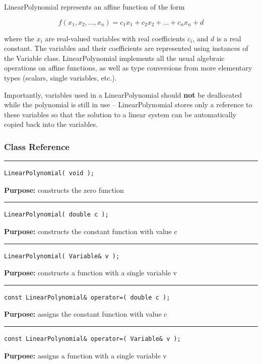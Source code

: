 \documentclass{article}
\begin{document}
 

 LinearPolynomial represents an affine function of the form 

 \[ f(x_1,x_2,...,x_n) = c_1 x_1 + c_2 x_2 + ... + c_n x_n + d \]

 where the \(x_i\) are real-valued variables with real coefficients \(c_i\), and \(d\) is a real constant.  The variables and their coefficients are represented using instances of the Variable class.  LinearPolynomial implements all the usual algebraic operations on affine functions, as well as type conversions from more elementary types (scalars, single variables, etc.). 

 Importantly, variables used in a LinearPolynomial should \textbf{not} be deallocated while the polynomial is still in use -- LinearPolynomial stores only a reference to these variables so that the solution to a linear system can be automatically copied back into the variables. 



\subsubsection{Class Reference}

\rule{5in}{1pt}
\begin{verbatim}
LinearPolynomial( void );
\end{verbatim}
\textbf{Purpose:}
constructs the zero function

\hspace{-.21in}\rule{5in}{1pt}
\begin{verbatim}
LinearPolynomial( double c );
\end{verbatim}
\textbf{Purpose:}
constructs the constant function with value c

\hspace{-.21in}\rule{5in}{1pt}
\begin{verbatim}
LinearPolynomial( Variable& v );
\end{verbatim}
\textbf{Purpose:}
constructs a function with a single variable v

\hspace{-.21in}\rule{5in}{1pt}
\begin{verbatim}
const LinearPolynomial& operator=( double c );
\end{verbatim}
\textbf{Purpose:}
assigns the constant function with value c

\hspace{-.21in}\rule{5in}{1pt}
\begin{verbatim}
const LinearPolynomial& operator=( Variable& v );
\end{verbatim}
\textbf{Purpose:}
assigns a function with a single variable v
\end{document}
